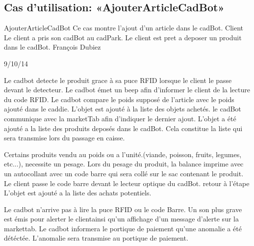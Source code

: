\subsection{Cas d'utilisation: «AjouterArticleCadBot» }

\startCU
\nom AjouterArticleCadBot
\but Ce cas montre l'ajout d'un article dans le cadBot.
\acteur Client
\precondition Le client a pris son cadBot au cadPark.
\declenchement Le client est pret a deposer un produit dans le cadBot.
\auteur François Dubiez
\date 29/10/14

\nominal %
\startnominal
\etape[SA1] Le cadbot detecte le produit grace à sa puce RFID lorsque le client le passe devant le detecteur. 
\etape[RETOUR] Le cadbot émet un beep afin d'informer le client de la lecture du code RFID.
\etape Le cadbot compare le poids supposé de l'article avec le poids ajouté dans le caddie.
\etape L'objet est ajouté à la liste des objets achetés.
\etape le cadBot communique avec la marketTab afin d'indiquer le dernier ajout.
\stopnominal
\postcondition L'objet a été ajouté a la liste des produits deposés dans le cadBot. Cela constitue la liste qui sera transmise lors du passage en caisse.

\alternatifs %
\startalternatif[SA1] %
  \etape Certains produits vendu au poids ou a l'unité.(viande, poisson, fruits, legumes, etc...), necessite un pesage.
  \etape Lors du pesage du produit, la balance imprime avec un autocollant avec un code barre qui sera collé sur le sac contenant le produit.
  \etape Le client passe le code barre devant le lecteur optique du cadBot.
  \etape retour à l'étape \in[RETOUR]
\stopcondition
\postcondition L'objet est ajouté a la liste des achats potentiels.
\stopalternatif


\exception %
\startalternatif[SA1]
   \etape Le cadbot n'arrive pas à lire la puce RFID ou le code Barre.
   \etape Un son plus grave est émis pour alerter le clientainsi qu'un affichage d'un message d'alerte sur la markettab.
   \etape Le cadbot informera le portique de paiement qu'une anomalie a été détéctée.
\stopcondition
\postcondition L'anomalie sera transmise au portique de paiement.
\stopalternatif

\stopCU
